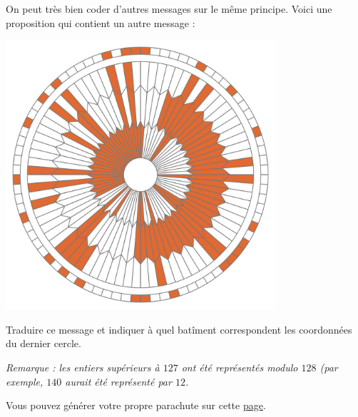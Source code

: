\documentclass[a4paper,dvipsnames]{article}
\begin{document}
On peut très bien coder d'autres messages sur le même principe. Voici une proposition qui contient un autre message :

\begin{center}
  \includegraphics[width=10cm]{img/parachute-perso.png}
\end{center}

\begin{exercice}{}{}
  Traduire ce message et indiquer à quel batîment correspondent les coordonnées du dernier cercle.

  \tcblower

  \textit{Remarque : les entiers supérieurs à $127$ ont été représentés \og{}modulo $128$\fg{} (par exemple, $140$ aurait été représenté par $12$.}
\end{exercice}

\medskip

\begin{remarque}{}{}
  Vous pouvez générer votre propre parachute sur cette \href{https://sjwarner.github.io/perseverance-parachute-generator/}{page}.
\end{remarque}
\end{document}
